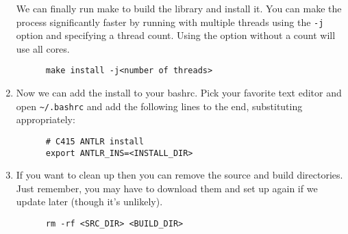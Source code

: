 \documentclass{article}
\begin{document}
\begin{enumerate}
    We can finally run make to build the library and install it. You can make the process
    significantly faster by running with multiple threads using the \lstinline{-j} option and
    specifying a thread count. Using the option without a count will use all cores.
    \begin{lstlisting}
      make install -j<number of threads>
    \end{lstlisting}
  \item
    Now we can add the install to your bashrc. Pick your favorite text editor and open
    \lstinline{~/.bashrc} and add the following lines to the end, substituting appropriately:
    \begin{lstlisting}
      # C415 ANTLR install
      export ANTLR_INS=<INSTALL_DIR>
    \end{lstlisting}
  \item
    If you want to clean up then you can remove the source and build directories. Just remember,
    you may have to download them and set up again if we update later (though it's unlikely).
    \begin{lstlisting}
      rm -rf <SRC_DIR> <BUILD_DIR>
    \end{lstlisting}
\end{enumerate}
\end{document}

